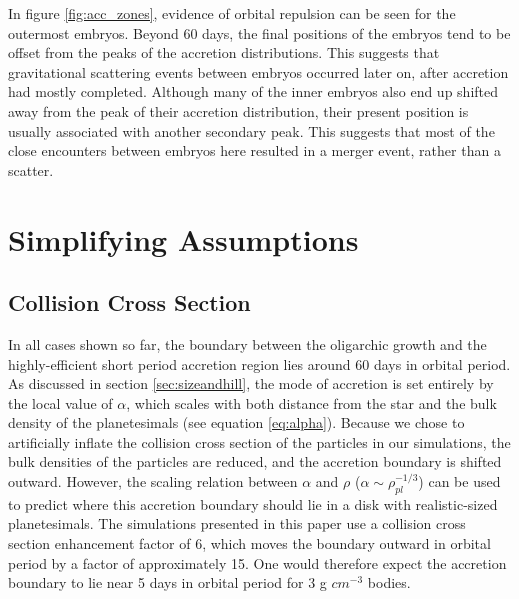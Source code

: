 \documentclass[twocolumn,linenumbers]{aastex63}
\begin{document}
In figure \ref{fig:acc_zones}, evidence of orbital repulsion can be seen for the outermost embryos. Beyond 60 days, the final positions of the embryos tend to be offset from the peaks of the accretion distributions. This suggests that gravitational scattering events between embryos occurred later on, after accretion had mostly completed. Although many of the inner embryos also end up shifted away from the peak of their accretion distribution, their present position is usually associated with another secondary peak. This suggests that most of the close encounters between embryos here resulted in a merger event, rather than a scatter.

\section{Simplifying Assumptions}\label{sec:assump}

\subsection{Collision Cross Section}

In all cases shown so far, the boundary between the
oligarchic growth and the highly-efficient short period accretion
region lies around 60 days in orbital period. As discussed in section \ref{sec:sizeandhill}, the mode of accretion is
set entirely by the local value of $\alpha$, which scales with both
distance from the star and the bulk density of the planetesimals (see
equation \ref{eq:alpha}). Because we chose to artificially inflate the
collision cross section of the particles in our simulations, the bulk densities
of the particles are reduced, and the accretion boundary is shifted outward.
However, the scaling relation between $\alpha$ and $\rho$ ($\alpha \sim \rho_{pl}^{-1/3}$) can be used
to predict where this accretion boundary should lie in a disk with realistic-sized planetesimals. The simulations
presented in this paper use a collision cross section enhancement factor of 6, which moves the boundary outward in orbital
period by a factor of approximately 15. One would therefore expect the accretion boundary to lie near 5 days in orbital period
for 3 g $cm^{-3}$ bodies.
\end{document}

